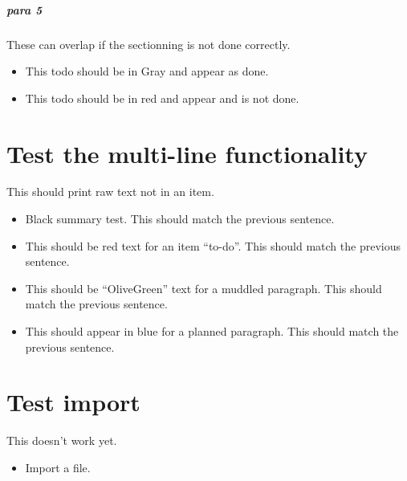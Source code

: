 \paragraph{para 5}
\label{autosec:7}
These can overlap if the sectionning is not done correctly.
    \begin{itemize}[noitemsep]
        \item {\color{Gray}This todo should be in Gray and appear as done.}
        \item {\color{red}This todo should be in red and appear and is not done.}
    \end{itemize}
\chapter{Test the multi-line functionality}
\label{autosec:7}
This should print raw text not in an item.
    \begin{itemize}[noitemsep]
        \item Black summary test.
This should match the previous sentence.
        \item {\color{red}This should be red text for an item ``to-do''.}
{\color{red}This should match the previous sentence.}
        \item {\color{OliveGreen}This should be ``OliveGreen'' text for a muddled paragraph.}
{\color{OliveGreen}This should match the previous sentence.}
        \item {\color{blue}This should appear in blue for a planned paragraph.}
{\color{blue}This should match the previous sentence.}
    \end{itemize}
\chapter{Test import}
\label{autosec:8}
This doesn't work yet.
    \begin{itemize}[noitemsep]
        \item {\color{red}Import a file.}
    \end{itemize}
